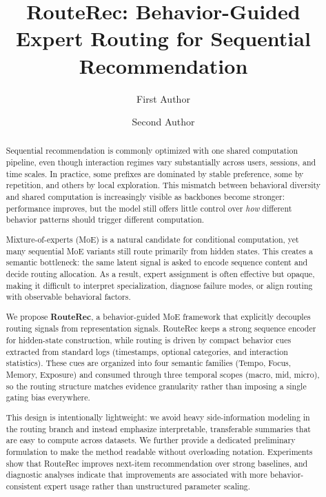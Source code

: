 \documentclass[sigconf,review,anonymous]{acmart}
\begin{document}
\title[RouteRec for Sequential Recommendation]{RouteRec: Behavior-Guided Expert Routing for Sequential Recommendation}

\author{First Author}

\author{Second Author}

\renewcommand{\shortauthors}{Author et al.}

\begin{abstract}
Sequential recommendation is commonly optimized with one shared computation pipeline, even though interaction regimes vary substantially across users, sessions, and time scales. In practice, some prefixes are dominated by stable preference, some by repetition, and others by local exploration. This mismatch between behavioral diversity and shared computation is increasingly visible as backbones become stronger: performance improves, but the model still offers little control over \emph{how} different behavior patterns should trigger different computation.

Mixture-of-experts (MoE) is a natural candidate for conditional computation, yet many sequential MoE variants still route primarily from hidden states. This creates a semantic bottleneck: the same latent signal is asked to encode sequence content and decide routing allocation. As a result, expert assignment is often effective but opaque, making it difficult to interpret specialization, diagnose failure modes, or align routing with observable behavioral factors.

We propose \textbf{RouteRec}, a behavior-guided MoE framework that explicitly decouples routing signals from representation signals. RouteRec keeps a strong sequence encoder for hidden-state construction, while routing is driven by compact behavior cues extracted from standard logs (timestamps, optional categories, and interaction statistics). These cues are organized into four semantic families (Tempo, Focus, Memory, Exposure) and consumed through three temporal scopes (macro, mid, micro), so the routing structure matches evidence granularity rather than imposing a single gating bias everywhere.

This design is intentionally lightweight: we avoid heavy side-information modeling in the routing branch and instead emphasize interpretable, transferable summaries that are easy to compute across datasets. We further provide a dedicated preliminary formulation to make the method readable without overloading notation. Experiments show that RouteRec improves next-item recommendation over strong baselines, and diagnostic analyses indicate that improvements are associated with more behavior-consistent expert usage rather than unstructured parameter scaling.
\end{abstract}
\end{document}
